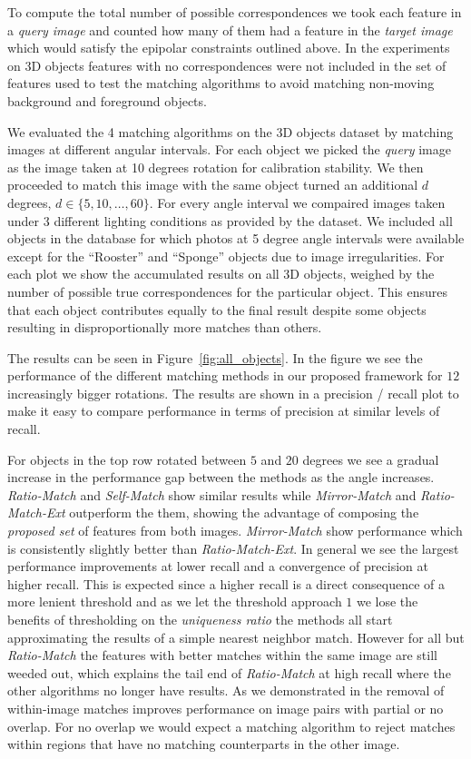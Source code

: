 \documentclass[journal]{IEEEtran}
\begin{document}
To compute the total number of possible correspondences we took each 
feature in a \emph{query image} and counted how many of them had a 
feature in the \emph{target image} which would satisfy the epipolar 
constraints outlined above. In the experiments on 3D objects features 
with no correspondences were not included in the set of features used to 
test the matching algorithms to avoid matching non-moving background and 
foreground objects.

We evaluated the 4 matching algorithms on the 3D objects dataset by 
matching images at different angular intervals. For each object we 
picked the \emph{query} image as the image taken at 10 degrees rotation 
for calibration stability.  We then proceeded to match this image with 
the same object turned an additional $d$ degrees, $d \in \{5, 10, 
\ldots, 60\}$.  For every angle interval we compaired images taken under 
3 different lighting conditions as provided by the dataset.
We included all objects in the database for which photos at 5 degree 
angle intervals were available except for the ``Rooster'' and ``Sponge'' 
objects due to image irregularities. For each plot we show the 
accumulated results on all 3D objects, weighed by the number of possible 
true correspondences for the particular object. This ensures that each 
object contributes equally to the final result despite some objects
resulting in disproportionally more matches than others.

The results can be seen in Figure~\ref{fig:all_objects}. In the figure 
we see the performance of the different matching methods in our proposed
framework for $12$ increasingly bigger rotations. The results are shown 
in a precision / recall plot to make it easy to compare performance in 
terms of precision at similar levels of recall.  

For objects in the top row rotated between $5$ and $20$ degrees we see a 
gradual increase in the performance gap between the methods as the angle 
increases.  \emph{Ratio-Match} and \emph{Self-Match} show similar 
results while \emph{Mirror-Match} and \emph{Ratio-Match-Ext} outperform 
the them, showing the advantage of composing the \emph{proposed set} of 
features from both images. \emph{Mirror-Match} show performance which is 
consistently slightly better than \emph{Ratio-Match-Ext}. In general we 
see the largest performance improvements at lower recall and a 
convergence of precision at higher recall. This is expected since a 
higher recall is a direct consequence of a more lenient threshold and as
we let the threshold approach $1$ we lose the benefits of thresholding 
on the \emph{uniqueness ratio} the methods all start approximating the 
results of a simple nearest neighbor match. However for all but 
\emph{Ratio-Match} the features with better matches within the same 
image are still weeded out, which explains the tail end of 
\emph{Ratio-Match} at high recall where the other algorithms no longer 
have results. As we demonstrated in \cite{arnfred2013mirror} the removal 
of within-image matches improves performance on image pairs with partial 
or no overlap. For no overlap we would expect a matching algorithm to 
reject matches within regions that have no matching counterparts in the 
other image.
\end{document}
